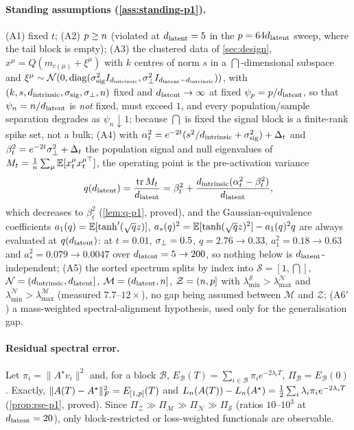 \paragraph{Standing assumptions (\cref{ass:standing-p1}).}
(A1) fixed $t$; (A2) $p\ge n$ (violated at $d_{\mathrm{latent}}=5$ in the $p=64d_{\mathrm{latent}}$ sweep, where the tail block is empty); (A3) the clustered data of \cref{sec:design}, $x^\mu=Q(m_{c(\mu)}+\xi^\mu)$ with $k$ centres of norm $s$ in a $\dint$-dimensional subspace and $\xi^\mu\sim\mathcal N(0,\operatorname{diag}(\sigma_{\mathrm{sig}}^2I_{d_{\mathrm{intrinsic}}},\sigma_{\perp}^2I_{d_{\mathrm{latent}}-d_{\mathrm{intrinsic}}}))$, with $(k,s,d_{\mathrm{intrinsic}},\sigma_{\mathrm{sig}},\sigma_{\perp},n)$ fixed and $d_{\mathrm{latent}}\to\infty$ at fixed $\psi_p=p/d_{\mathrm{latent}}$, so that $\psi_n=n/d_{\mathrm{latent}}$ is \emph{not} fixed, must exceed $1$, and every population/sample separation degrades as $\psi_n\downarrow1$; because $\dint$ is fixed the signal block is a finite-rank spike set, not a bulk; (A4) with $\alpha_t^2=e^{-2t}(s^2/d_{\mathrm{intrinsic}}+\sigma_{\mathrm{sig}}^2)+\Delta_t$ and $\beta_t^2=e^{-2t}\sigma_{\perp}^2+\Delta_t$ the population signal and null eigenvalues of $M_t=\tfrac1{n}\sum_\mu\mathbb{E}[x_t^\mu x_t^{\mu\top}]$, the operating point is the pre-activation variance
\begin{equation}\label{eq:fourbulk-q-main}
q(d_{\mathrm{latent}})=\frac{\operatorname{tr}M_t}{d_{\mathrm{latent}}}=\beta_t^2+\frac{d_{\mathrm{intrinsic}}(\alpha_t^2-\beta_t^2)}{d_{\mathrm{latent}}},
\end{equation}
which decreases to $\beta_t^2$ (\cref{lem:q-p1}, proved), and the Gaussian-equivalence coefficients $a_1(q)=\mathbb{E}[\tanh'(\sqrt qz)]$, $a_*(q)^2=\mathbb{E}[\tanh(\sqrt qz)^2]-a_1(q)^2q$ \citep{pennington2017nonlinear,benigni2021eigenvalue,goldt2022gaussian,hu2022universality} are always evaluated at $q(d_{\mathrm{latent}})$: at $t=0.01$, $\sigma_{\perp}=0.5$, $q=2.76\to0.33$, $a_1^2=0.18\to0.63$ and $a_*^2=0.079\to0.0047$ over $d_{\mathrm{latent}}=5\to200$, so nothing below is $d_{\mathrm{latent}}$-independent; (A5) the sorted spectrum splits by index into $\mathcal S=[1,\dint]$, $\mathcal N=(d_{\mathrm{intrinsic}},d_{\mathrm{latent}}]$, $\mathcal M=(d_{\mathrm{latent}},n]$, $\mathcal Z=(n,p]$ with $\lambda^{\mathcal S}_{\min}>\lambda^{\mathcal N}_{\max}$ and $\lambda^{\mathcal N}_{\min}>\lambda^{\mathcal M}_{\max}$ (measured $7.7$--$12\times$), no gap being assumed between $\mathcal M$ and $\mathcal Z$; (A6$'$) a mass-weighted spectral-alignment hypothesis, used only for the generalisation gap.

\paragraph{Residual spectral error.}
Let $\pi_i=\|A^\star v_i\|^2$ and, for a block $\mathcal B$, $E_{\mathcal B}(T)=\sum_{i\in\mathcal B}\pi_ie^{-2\lambda_iT}$, $\Pi_{\mathcal B}=E_{\mathcal B}(0)$. Exactly, $\|A(T)-A^\star\|_F^2=E_{[1,p]}(T)$ and $L_{n}(A(T))-L_{n}(A^\star)=\tfrac12\sum_i\lambda_i\pi_ie^{-2\lambda_iT}$ (\cref{prop:rse-p1}, proved). Since $\Pi_{\mathcal Z}\gg\Pi_{\mathcal M}\gg\Pi_{\mathcal N}\gg\Pi_{\mathcal S}$ (ratios $10$--$10^3$ at $d_{\mathrm{latent}}=20$), only block-restricted or loss-weighted functionals are observable.


